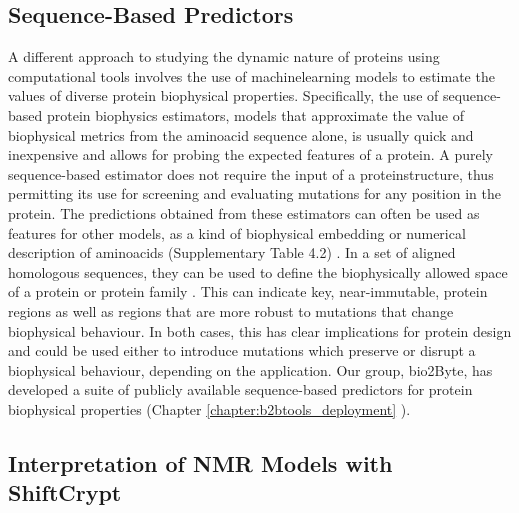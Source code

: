 \subsection{Sequence-Based Predictors}

A different approach to studying the dynamic nature of proteins using computational tools involves the use of \gls{machinelearning} models to estimate the values of diverse protein biophysical properties. Specifically, the use of sequence-based protein biophysics estimators, models that approximate the value of biophysical metrics from the \gls{aminoacid} sequence alone, is usually quick and inexpensive and allows for probing the expected features of a protein. A purely sequence-based estimator does not require the input of a \gls{proteinstructure}, thus permitting its use for screening and evaluating mutations for any position in the protein. The predictions obtained from these estimators can often be used as features for other models, as a kind of biophysical embedding or numerical description of \glspl{aminoacid} (Supplementary Table 4.2)
\cite{raimondi_exploring_2017, orlando_computational_2019, orlando_accurate_2020, orlando_prediction_2022}. In a set of aligned homologous sequences, they can be used to define the biophysically allowed space of a protein or protein family \cite{kagami_online_2021}. This can indicate key, near-immutable, protein regions as well as regions that are more robust to mutations that change biophysical behaviour. In both cases, this has clear implications for protein design and could be used either to introduce mutations which preserve or disrupt a biophysical behaviour, depending on the application. Our group, bio2Byte, has developed a suite of publicly available sequence-based predictors for protein biophysical properties (Chapter \ref{chapter:b2btools_deployment} \cite{gavalda-garcia_bio2byte_2024}).


\subsection{Interpretation of NMR Models with ShiftCrypt}

